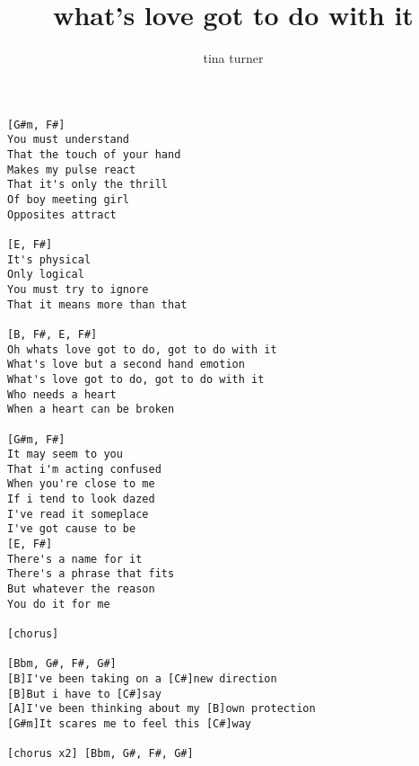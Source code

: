 \author{tina turner}
\title{what's love got to do with it}
\maketitle
\begin{verbatim}
[G#m, F#]
You must understand
That the touch of your hand
Makes my pulse react
That it's only the thrill
Of boy meeting girl
Opposites attract

[E, F#]
It's physical
Only logical
You must try to ignore
That it means more than that
                        
[B, F#, E, F#]
Oh whats love got to do, got to do with it
What's love but a second hand emotion
What's love got to do, got to do with it
Who needs a heart
When a heart can be broken

[G#m, F#]
It may seem to you
That i'm acting confused
When you're close to me
If i tend to look dazed
I've read it someplace
I've got cause to be
[E, F#]
There's a name for it
There's a phrase that fits
But whatever the reason
You do it for me

[chorus]

[Bbm, G#, F#, G#]
[B]I've been taking on a [C#]new direction
[B]But i have to [C#]say
[A]I've been thinking about my [B]own protection
[G#m]It scares me to feel this [C#]way

[chorus x2] [Bbm, G#, F#, G#]
\end{verbatim}
